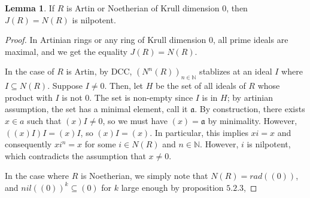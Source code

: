\documentclass{article}
\theoremstyle{definition}
\theoremstyle{definition}
\theoremstyle{definition}
\theoremstyle{definition}
\newtheorem{lemma}[theorem]{Lemma}
\theoremstyle{definition}
\theoremstyle{definition}
\theoremstyle{definition}
\begin{document}
\begin{tcolorbox}
\begin{lemma}
    If $R$ is Artin or Noetherian of Krull dimension $0$, then $J(R)=N(R)$ is nilpotent.
\end{lemma}
\end{tcolorbox}
\begin{proof}
    In Artinian rings or any ring of Krull dimension $0$, all prime ideals are maximal, and we get the equality $J(R)=N(R)$.
    
    In the case of $R$ is Artin, by DCC, $(N^n(R))_{n\in \mathbb{N}}$ stablizes at an ideal $I$ where $I\subseteq N(R) $. Suppose $I\neq 0$. Then, let $H$ be the set of all ideals of $R$ whose product with $I$ is not $0$. The set is non-empty since $I$ is in $H$; by artinian assumption, the set has a minimal element, call it $\mathfrak{a}$. By construction, there exists $x\in a$ such that $(x)I\neq 0$, so we must have $(x)=\mathfrak{a}$ by minimality. However, $((x)I)I=(x)I$, so $(x)I=(x)$. In particular, this implies $xi=x$ and consequently $xi^n=x$ for some $i\in N(R)$ and $n\in \mathbb{N}$. However, $i$ is nilpotent, which contradicts the assumption that $x\neq 0$. 

    In the case where $R$ is Noetherian, we simply note that $N(R)=rad((0))$, and $nil((0))^k\subseteq (0)$ for $k$ large enough by proposition $5.2.3$,
\end{proof}
\end{document}

